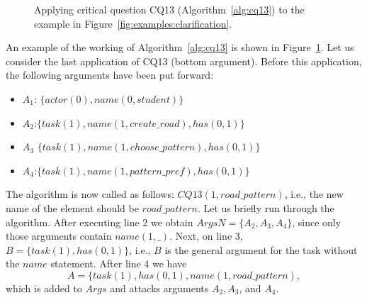 \begin{figure}[ht!]
\centering
\caption{Applying critical question CQ13 (Algorithm~\ref{alg:cq13}) to the example in Figure~\ref{fig:examples:clarification}.}
\label{fig:examples:clarification:formal}
\end{figure} 

An example of the working of Algorithm~\ref{alg:cq13} is shown in Figure~\ref{fig:examples:clarification:formal}. Let us consider the last application of CQ13 (bottom argument). Before this application, the following arguments have been put forward:
\begin{itemize}
\item $A_1$: $\{actor(0),name(0,student)\}$
\item $A_2$:$\{task(1),name(1,create\_road),has(0,1)\}$
\item $A_3$ $\{task(1),name(1,choose\_pattern),has(0,1)\}$
\item $A_4$:$\{task(1),name(1,pattern\_pref),has(0,1)\}$
\end{itemize}
The algorithm is now called as follows: $CQ13(1,road\_pattern)$, i.e., the new name of the element should be $road\_pattern$. Let us briefly run through the algorithm. After executing line 2 we obtain $ArgsN=\{A_2,A_3,A_4\}$, since only those arguments contain $name(1,\_)$. Next, on line 3, $B=\{task(1),has(0,1)\}$, i.e., $B$ is the general argument for the task without the $name$ statement. After line 4 we have $$A=\{task(1),has(0,1),name(1,road\_pattern),$$ which is added to $Args$ and attacks arguments $A_2,A_3$, and $A_4$. 

